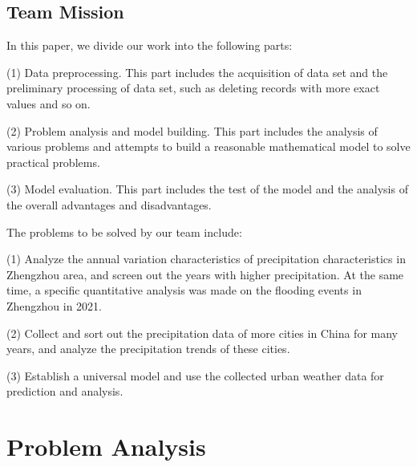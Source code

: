 \documentclass{swmcmthesis}
\begin{document}
\subsection{Team Mission}
In this paper, we divide our work into the following parts:
\par
(1) Data preprocessing. This part includes the acquisition of data set and the preliminary processing of data set, such as deleting records with more exact values and so on.
\par
(2) Problem analysis and model building. This part includes the analysis of various problems and attempts to build a reasonable mathematical model to solve practical problems.
\par
(3) Model evaluation. This part includes the test of the model and the analysis of the overall advantages and disadvantages.
\par
The problems to be solved by our team include:
\par
(1) Analyze the annual variation characteristics of precipitation characteristics in Zhengzhou area, and screen out the years with higher precipitation. At the same time, a specific quantitative analysis was made on the flooding events in Zhengzhou in 2021.
\par
(2) Collect and sort out the precipitation data of more cities in China for many years, and analyze the precipitation trends of these cities.
\par
(3) Establish a universal model and use the collected urban weather data for prediction and analysis.

\section{Problem Analysis}
\end{document}
